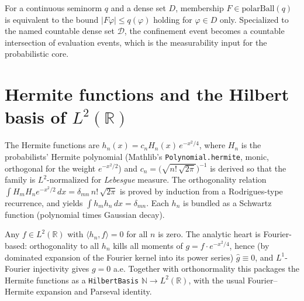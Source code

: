 \begin{proposition}\label{prop:mit-polar-dense-check}
  \leanok
  For a continuous seminorm $q$ and a dense set $D$, membership $F \in \mathrm{polarBall}(q)$ is
  equivalent to the bound $|F\varphi| \le q(\varphi)$ holding for $\varphi \in D$ only.
  Specialized to the named countable dense set $\mathcal{D}$, the confinement event becomes a
  countable intersection of evaluation events, which is the measurability input for the
  probabilistic core.
\end{proposition}

\section{Hermite functions and the Hilbert basis of \texorpdfstring{$L^2(\mathbb{R})$}{L2(R)}}

\begin{definition}\label{def:mit-hermite-fun}
  \leanok
  The Hermite functions are $h_n(x) = c_n H_n(x)\, e^{-x^2/4}$, where $H_n$ is the probabilists'
  Hermite polynomial (Mathlib's \texttt{Polynomial.hermite}, monic, orthogonal for the weight
  $e^{-x^2/2}$) and $c_n = \bigl(\sqrt{n!\,\sqrt{2\pi}}\bigr)^{-1}$ is derived so that the family is
  $L^2$-normalized for \emph{Lebesgue} measure.  The orthogonality relation
  $\int H_m H_n e^{-x^2/2}\,dx = \delta_{mn}\, n!\,\sqrt{2\pi}$ is proved by induction from a
  Rodrigues-type recurrence, and yields $\int h_m h_n\,dx = \delta_{mn}$.  Each $h_n$ is bundled as
  a Schwartz function (polynomial times Gaussian decay).
\end{definition}

\begin{theorem}\label{thm:mit-hermite-basis}
  \leanok
  Any $f \in L^2(\mathbb{R})$ with $\langle h_n, f\rangle = 0$ for all $n$ is zero.  The analytic
  heart is Fourier-based: orthogonality to all $h_n$ kills all moments of $g = f \cdot e^{-x^2/4}$,
  hence (by dominated expansion of the Fourier kernel into its power series) $\widehat{g} \equiv 0$,
  and $L^1$-Fourier injectivity gives $g = 0$ a.e.  Together with orthonormality this packages the
  Hermite functions as a \texttt{HilbertBasis} $\mathbb{N} \to L^2(\mathbb{R})$, with the usual
  Fourier--Hermite expansion and Parseval identity.
\end{theorem}

